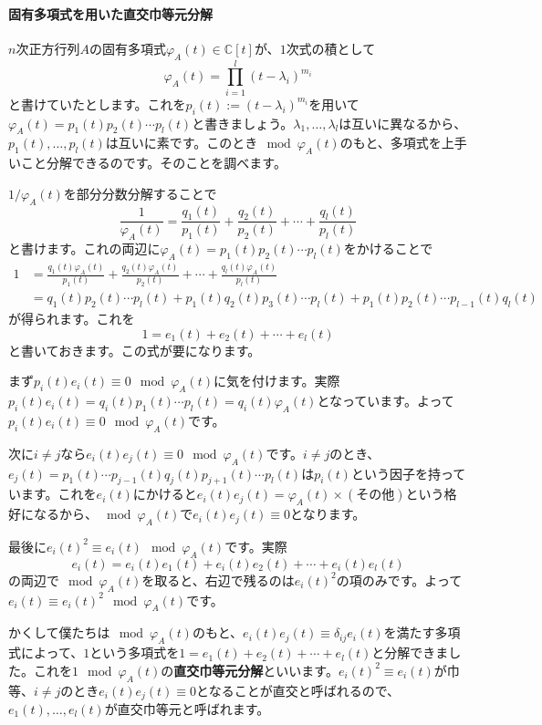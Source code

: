 \paragraph{固有多項式を用いた直交巾等元分解}

$n$次正方行列$A$の固有多項式$\varphi_A(t) \in \mathbb{C}[t]$が、$1$次式の積として
\[
\varphi_A(t) = \prod_{i = 1}^l (t - \lambda_i)^{m_i}
\]
と書けていたとします。これを$p_i(t) := (t - \lambda_i)^{m_i}$を用いて$\varphi_A(t) = p_1(t) p_2(t) \cdots p_l(t)$と書きましょう。$\lambda_1, \ldots, \lambda_l$は互いに異なるから、$p_1(t), \ldots, p_l(t)$は互いに素です。このとき$\!\!\mod \varphi_A(t)$のもと、多項式を上手いこと分解できるのです。そのことを調べます。

$1/\varphi_A(t)$を部分分数分解することで
\[
\frac{1}{\varphi_A(t)} = \frac{q_1(t)}{p_1(t)} + \frac{q_2(t)}{p_2(t)} + \cdots + \frac{q_l(t)}{p_l(t)}
\]
と書けます。これの両辺に$\varphi_A(t) = p_1(t) p_2(t) \cdots p_l(t)$をかけることで
\begin{align*}
1 &= \frac{q_1(t)\varphi_A(t)}{p_1(t)} + \frac{q_2(t)\varphi_A(t)}{p_2(t)} + \cdots + \frac{q_l(t)\varphi_A(t)}{p_l(t)} \\
&= q_1(t) p_2(t) \cdots p_l(t) + p_1(t) q_2(t) p_3(t) \cdots p_l(t) + p_1(t) p_2(t) \cdots p_{l - 1}(t) q_l(t)
\end{align*}
が得られます。これを
\[
1 = e_1(t) + e_2(t) + \cdots + e_l(t)
\]
と書いておきます。この式が要になります。

まず$p_i(t) e_i(t) \equiv 0 \mod \varphi_A(t)$に気を付けます。実際$p_i(t) e_i(t) = q_i(t) p_1(t) \cdots p_l(t) = q_i(t) \varphi_A(t)$となっています。よって$p_i(t) e_i(t) \equiv 0 \mod \varphi_A(t)$です。

次に$i \neq j$なら$e_i(t) e_j (t) \equiv 0 \mod \varphi_A(t)$です。$i \neq j$のとき、$e_j(t) = p_1(t) \cdots p_{j - 1}(t) q_j(t) p_{j + 1}(t) \cdots p_l(t)$は$p_i(t)$という因子を持っています。これを$e_i(t)$にかけると$e_i(t) e_j(t) = \varphi_A(t) \times (\text{その他})$という格好になるから、$\mod \varphi_A(t)$で$e_i(t) e_j(t) \equiv 0$となります。

最後に$e_i(t)^2 \equiv e_i(t) \mod \varphi_A(t)$です。実際
\[
e_i(t) = e_i(t) e_1(t) + e_i(t) e_2(t) + \cdots + e_i(t) e_l(t)
\]
の両辺で$\!\!\mod \varphi_A(t)$を取ると、右辺で残るのは$e_i(t)^2$の項のみです。よって$e_i(t) \equiv e_i(t)^2 \mod \varphi_A(t)$です。

かくして僕たちは$\!\!\mod \varphi_A(t)$のもと、$e_i(t) e_j(t) \equiv \delta_{ij} e_i(t)$を満たす多項式によって、$1$という多項式を$1 = e_1(t) + e_2(t) + \cdots + e_l(t)$と分解できました。これを$1 \mod \varphi_A(t)$の\textbf{直交巾等元分解}といいます。$e_i(t)^2 \equiv e_i(t)$が巾等、$i \neq j$のとき$e_i(t) e_j(t) \equiv 0$となることが直交と呼ばれるので、$e_1(t), \ldots, e_l(t)$が直交巾等元と呼ばれます。

